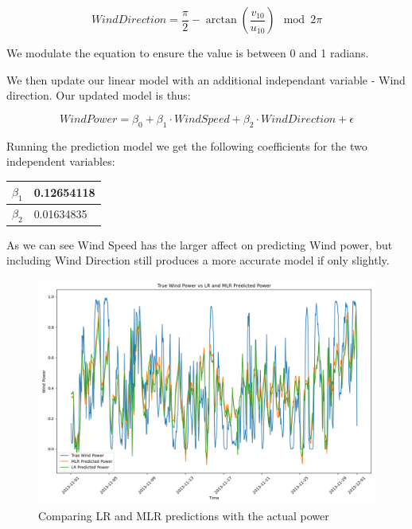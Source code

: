 \documentclass[a4paper, article, oneside, USenglish, IN5460]{memoir}
\begin{document}
\begin{equation}
WindDirection = \frac{\pi}{2} - \arctan \left(\frac{v_{10}}{u_{10}}\right) \mod 2\pi
\end{equation}

We modulate the equation to ensure the value is between 0 and 1 radians.

We then update our linear model with an additional independant variable - Wind direction. Our updated model is thus:

\begin{equation}
WindPower = \beta_0 + \beta_1 \cdot WindSpeed + \beta_2 \cdot WindDirection + \epsilon
\end{equation}


Running the prediction model we get the following coefficients for the two independent variables:

\begin{table}[H]\centering
\begin{tabular}{|l|l|}
\hline
$\beta_1$ & 0.12654118  \\ \hline
$\beta_2$   & 0.01634835   \\ \hline
\end{tabular}
\end{table}

As we can see Wind Speed has the larger affect on predicting Wind power, but including Wind Direction still produces a more accurate model if only slightly.

\begin{figure}[H]
    \centering
    \includegraphics[width=1\linewidth]{fig/q2-forecast.png}
    \caption{Comparing LR and MLR predictions with the actual power}
    \label{fig:q2-forecast}
\end{figure}
\end{document}
